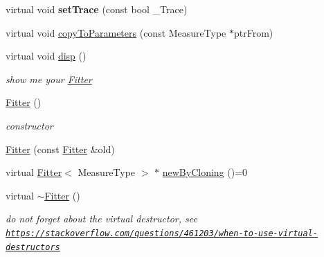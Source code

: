 \begin{DoxyCompactItemize}
\item 
\hypertarget{class_ox_1_1_fitter_a4ac0096f6bc6d733c542d28a839d32c9}{virtual void {\bfseries set\-Trace} (const bool \-\_\-\-Trace)}\label{class_ox_1_1_fitter_a4ac0096f6bc6d733c542d28a839d32c9}

\item 
virtual void \hyperlink{class_ox_1_1_fitter_a783ba791c88d7208deb4004354b10022}{copy\-To\-Parameters} (const Measure\-Type $\ast$ptr\-From)
\item 
\hypertarget{class_ox_1_1_fitter_a0a9b45eb21ba174327f95a894e6331b6}{virtual void \hyperlink{class_ox_1_1_fitter_a0a9b45eb21ba174327f95a894e6331b6}{disp} ()}\label{class_ox_1_1_fitter_a0a9b45eb21ba174327f95a894e6331b6}

\begin{DoxyCompactList}\small\item\em show me your \hyperlink{class_ox_1_1_fitter}{Fitter} \end{DoxyCompactList}\item 
\hypertarget{class_ox_1_1_fitter_a7b42acb389394bc4c496990eea8b9ac9}{\hyperlink{class_ox_1_1_fitter_a7b42acb389394bc4c496990eea8b9ac9}{Fitter} ()}\label{class_ox_1_1_fitter_a7b42acb389394bc4c496990eea8b9ac9}

\begin{DoxyCompactList}\small\item\em constructor \end{DoxyCompactList}\item 
\hyperlink{class_ox_1_1_fitter_ac51130b722159f88a0dad59877b76417}{Fitter} (const \hyperlink{class_ox_1_1_fitter}{Fitter} \&old)
\item 
virtual \hyperlink{class_ox_1_1_fitter}{Fitter}$<$ Measure\-Type $>$ $\ast$ \hyperlink{class_ox_1_1_fitter_a665ec51e52ed351c9ef801acc83fbdea}{new\-By\-Cloning} ()=0
\item 
\hypertarget{class_ox_1_1_fitter_ab56eef37096f6f0687d83b8d15e00d43}{virtual \hyperlink{class_ox_1_1_fitter_ab56eef37096f6f0687d83b8d15e00d43}{$\sim$\-Fitter} ()}\label{class_ox_1_1_fitter_ab56eef37096f6f0687d83b8d15e00d43}

\begin{DoxyCompactList}\small\item\em do not forget about the virtual destructor, see \href{https://stackoverflow.com/questions/461203/when-to-use-virtual-destructors}{\tt https\-://stackoverflow.\-com/questions/461203/when-\/to-\/use-\/virtual-\/destructors} \end{DoxyCompactList}\end{DoxyCompactItemize}
